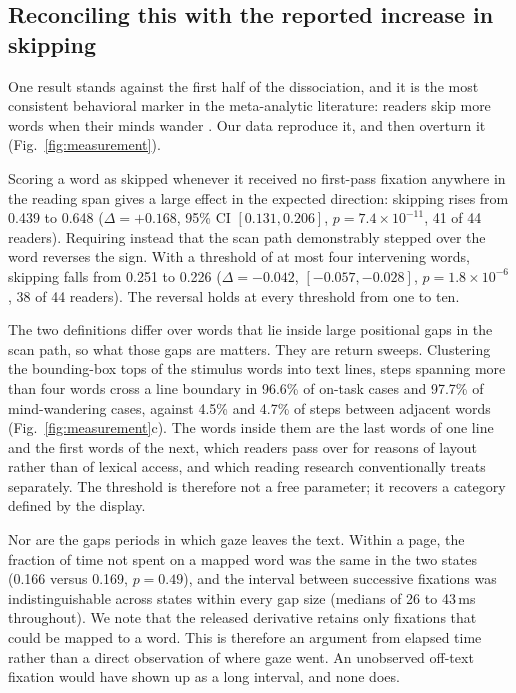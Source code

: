 \documentclass[11pt]{article}
\begin{document}
\subsection{Reconciling this with the reported increase in skipping}

One result stands against the first half of the dissociation, and it is the most consistent
behavioral marker in the meta-analytic literature: readers skip more words when their minds
wander \citep{meziere2025}. Our data reproduce it, and then overturn it
(Fig.~\ref{fig:measurement}).

Scoring a word as skipped whenever it received no first-pass fixation anywhere in the reading
span gives a large effect in the expected direction: skipping rises from 0.439 to 0.648
($\Delta=+0.168$, 95\% CI $[0.131, 0.206]$, $p=7.4\times10^{-11}$, 41 of 44 readers).
Requiring instead that the scan path demonstrably stepped over the word reverses the sign.
With a threshold of at most four intervening words, skipping falls from 0.251 to 0.226
($\Delta=-0.042$, $[-0.057, -0.028]$, $p=1.8\times10^{-6}$, 38 of 44 readers). The reversal
holds at every threshold from one to ten.

The two definitions differ over words that lie inside large positional gaps in the scan path,
so what those gaps are matters. They are return sweeps. Clustering the bounding-box tops of the
stimulus words into text lines, steps spanning more than four words cross a line boundary in
96.6\% of on-task cases and 97.7\% of mind-wandering cases, against 4.5\% and 4.7\% of steps
between adjacent words (Fig.~\ref{fig:measurement}c). The words inside them are the last words
of one line and the first words of the next, which readers pass over for reasons of layout
rather than of lexical access, and which reading research conventionally treats separately. The
threshold is therefore not a free parameter; it recovers a category defined by the display.

Nor are the gaps periods in which gaze leaves the text. Within a page, the fraction of time not
spent on a mapped word was the same in the two states (0.166 versus 0.169, $p=0.49$), and the
interval between successive fixations was indistinguishable across states within every gap size
(medians of 26 to 43\,ms throughout). We note that the released derivative retains only fixations that could be mapped to a word. This
is therefore an argument from elapsed time rather than a direct observation of where gaze went. An
unobserved off-text fixation would have shown up as a long interval, and none does.
\end{document}
